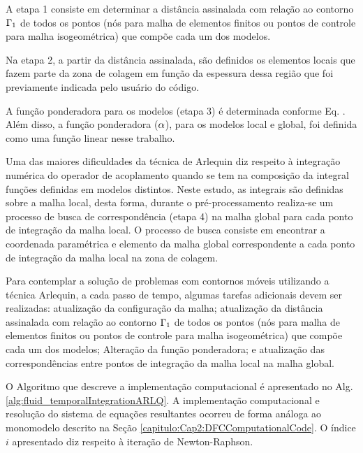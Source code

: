\documentclass[tese_patricia]{subfiles}
\begin{document}
A etapa 1 consiste em determinar a distância assinalada com relação ao contorno $\Gamma_1$ de todos os pontos (nós para malha de elementos finitos ou pontos de controle para malha isogeométrica) que compõe cada um dos modelos.

Na etapa 2, a partir da distância assinalada, são definidos os elementos locais que fazem parte da zona de colagem em função da espessura dessa região que foi previamente indicada pelo usuário do código.

A função ponderadora para os modelos (etapa 3) é  determinada conforme Eq. . Além disso, a função ponderadora ($\alpha$), para os modelos local e global, foi definida como uma função linear nesse trabalho. 

Uma das maiores dificuldades da técnica de Arlequin diz respeito à integração numérica do operador de acoplamento quando se tem na composição da integral funções definidas em modelos distintos. Neste estudo, as integrais são definidas sobre a malha local, desta forma, durante o pré-processamento realiza-se um processo de busca de correspondência (etapa 4) na malha global para cada ponto de integração da malha local. O processo de busca consiste em encontrar a coordenada paramétrica e elemento da malha global correspondente a cada ponto de integração da malha local na zona de colagem.

Para contemplar a solução de problemas com contornos móveis utilizando a técnica Arlequin, a cada passo de tempo, algumas tarefas adicionais devem ser realizadas: atualização da configuração da malha; atualização da distância assinalada com relação ao contorno $\Gamma_1$ de todos os pontos (nós para malha de elementos finitos ou pontos de controle para malha isogeométrica) que compõe cada um dos modelos;  Alteração da função ponderadora; e atualização das correspondências entre pontos de integração da malha local na malha global.

O Algoritmo que descreve a implementação computacional é apresentado no Alg. \ref{alg:fluid_temporalIntegrationARLQ}. A implementação computacional e resolução do sistema de equações resultantes ocorreu de forma análoga ao monomodelo descrito na Seção \ref{capitulo:Cap2:DFCComputationalCode}. O índice $i$ apresentado diz respeito à iteração de Newton-Raphson.
\end{document}
